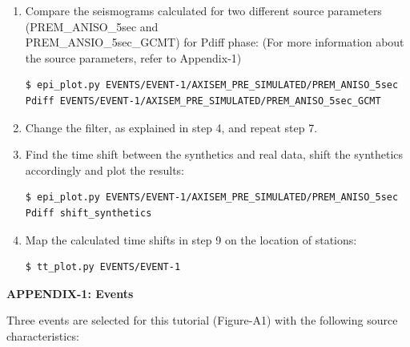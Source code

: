 \documentclass{article}
\begin{document}
\begin{enumerate}
\item Compare the seismograms calculated for two different source parameters (PREM\_ANISO\_5sec and \\
PREM\_ANSIO\_5sec\_GCMT) for Pdiff phase: (For more information about the source 
parameters, refer to Appendix-1)

\begin{lstlisting}
$ epi_plot.py EVENTS/EVENT-1/AXISEM_PRE_SIMULATED/PREM_ANISO_5sec
Pdiff EVENTS/EVENT-1/AXISEM_PRE_SIMULATED/PREM_ANISO_5sec_GCMT
\end{lstlisting}

\item Change the filter, as explained in step 4, and repeat step 7.

\item Find the time shift between the synthetics and real data, shift the synthetics 
accordingly and plot the results:

\begin{lstlisting}
$ epi_plot.py EVENTS/EVENT-1/AXISEM_PRE_SIMULATED/PREM_ANISO_5sec
Pdiff shift_synthetics 
\end{lstlisting}

\item Map the calculated time shifts in step 9 on the location of stations:

\begin{lstlisting}
$ tt_plot.py EVENTS/EVENT-1
\end{lstlisting}

\end{enumerate}

\newpage
{\large{}\textbf{APPENDIX-1: Events}}

Three events are selected for this tutorial (Figure-A1) with the following source 
characteristics:
\end{document}

